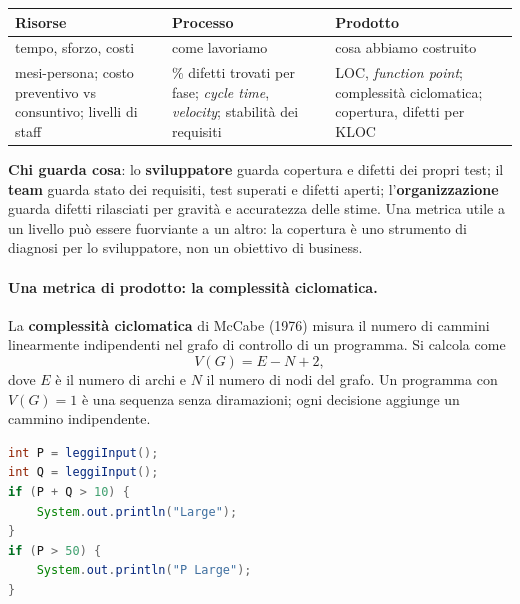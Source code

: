\documentclass[12pt]{extarticle}
\begin{document}
\begin{center}
\small
\begin{tabular}{p{5.2cm}p{5.2cm}p{5.2cm}}
    \toprule
    \textbf{Risorse} & \textbf{Processo} & \textbf{Prodotto} \\
    \midrule
    tempo, sforzo, costi & come lavoriamo & cosa abbiamo costruito \\
    \addlinespace
    mesi-persona; costo preventivo vs consuntivo; livelli di staff & \% difetti trovati per fase; \textit{cycle time}, \textit{velocity}; stabilità dei requisiti & LOC, \textit{function point}; complessità ciclomatica; copertura, difetti per KLOC \\
    \bottomrule
\end{tabular}
\end{center}

\noindent \textbf{Chi guarda cosa}: lo \textbf{sviluppatore} guarda copertura e difetti dei propri test; il \textbf{team} guarda stato dei requisiti, test superati e difetti aperti; l'\textbf{organizzazione} guarda difetti rilasciati per gravità e accuratezza delle stime. Una metrica utile a un livello può essere fuorviante a un altro: la copertura è uno strumento di diagnosi per lo sviluppatore, non un obiettivo di business.

\paragraph{Una metrica di prodotto: la complessità ciclomatica.}
La \textbf{complessità ciclomatica} di McCabe (1976) misura il numero di cammini linearmente indipendenti nel grafo di controllo di un programma. Si calcola come
\[
V(G) = E - N + 2,
\]
dove $E$ è il numero di archi e $N$ il numero di nodi del grafo. Un programma con $V(G)=1$ è una sequenza senza diramazioni; ogni decisione aggiunge un cammino indipendente.

\begin{lstlisting}[language=Java]
int P = leggiInput();
int Q = leggiInput();
if (P + Q > 10) {
    System.out.println("Large");
}
if (P > 50) {
    System.out.println("P Large");
}
\end{lstlisting}

\begin{center}
\end{center}
\end{document}
